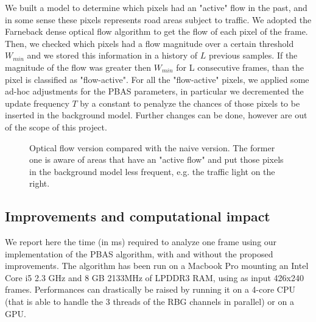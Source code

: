 We built a model to determine which pixels had an "active" flow in the past, and in some sense these pixels represents road areas subject to traffic. We adopted the Farneback dense optical flow algorithm to get the flow of each pixel of the frame. Then, we checked which pixels had a flow magnitude over a certain threshold $W_{min}$ and we stored this information in a history of $L$ previous samples. If the magnitude of the flow was greater then $W_{min}$ for L consecutive frames, than the pixel is classified as "flow-active". For all the "flow-active" pixels, we applied some ad-hoc adjustments for the PBAS parameters, in particular we decremented the update frequency $T$ by a constant to penalyze the chances of those pixels to be inserted in the background model. Further changes can be done, however are out of the scope of this project.

\begin{figure}[!t]
    \centering
    \newline
	\caption{Optical flow version compared with the naive version. The former one is aware of areas that have an "active flow" and put those pixels in the background model less frequent, e.g. the traffic light on the right.}
\end{figure}

\subsection*{Improvements and computational impact}
We report here the time (in ms) required to analyze one frame using our implementation of the PBAS algorithm, with and without the proposed improvements. The algorithm has been run on a Macbook Pro mounting an Intel Core i5 2.3 GHz and 8 GB 2133MHz of LPDDR3 RAM, using as input 426x240 frames. Performances can drastically be raised by running it on a 4-core CPU (that is able to handle the 3 threads of the RBG channels in parallel) or on a GPU.

